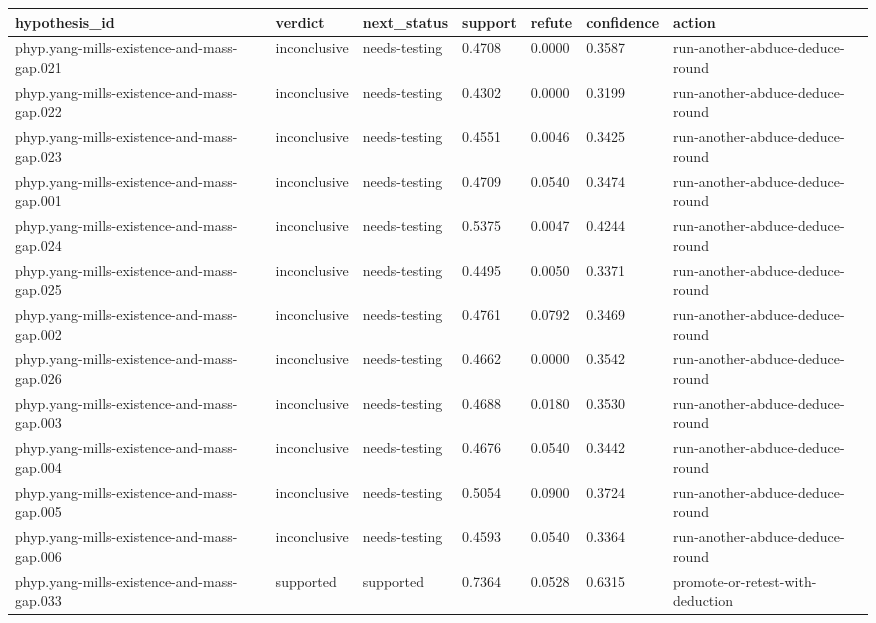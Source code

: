 \documentclass[
]{article}
\newcounter{none} %
\begin{document}
{\def\LTcaptype{none} %
\begin{longtable}[]{@{}lllllll@{}}
\toprule\noalign{}
hypothesis\_id & verdict & next\_status & support & refute & confidence
& action \\
\midrule\noalign{}
\endhead
\bottomrule\noalign{}
\endlastfoot
phyp.yang-mills-existence-and-mass-gap.021 & inconclusive &
needs-testing & 0.4708 & 0.0000 & 0.3587 &
run-another-abduce-deduce-round \\
phyp.yang-mills-existence-and-mass-gap.022 & inconclusive &
needs-testing & 0.4302 & 0.0000 & 0.3199 &
run-another-abduce-deduce-round \\
phyp.yang-mills-existence-and-mass-gap.023 & inconclusive &
needs-testing & 0.4551 & 0.0046 & 0.3425 &
run-another-abduce-deduce-round \\
phyp.yang-mills-existence-and-mass-gap.001 & inconclusive &
needs-testing & 0.4709 & 0.0540 & 0.3474 &
run-another-abduce-deduce-round \\
phyp.yang-mills-existence-and-mass-gap.024 & inconclusive &
needs-testing & 0.5375 & 0.0047 & 0.4244 &
run-another-abduce-deduce-round \\
phyp.yang-mills-existence-and-mass-gap.025 & inconclusive &
needs-testing & 0.4495 & 0.0050 & 0.3371 &
run-another-abduce-deduce-round \\
phyp.yang-mills-existence-and-mass-gap.002 & inconclusive &
needs-testing & 0.4761 & 0.0792 & 0.3469 &
run-another-abduce-deduce-round \\
phyp.yang-mills-existence-and-mass-gap.026 & inconclusive &
needs-testing & 0.4662 & 0.0000 & 0.3542 &
run-another-abduce-deduce-round \\
phyp.yang-mills-existence-and-mass-gap.003 & inconclusive &
needs-testing & 0.4688 & 0.0180 & 0.3530 &
run-another-abduce-deduce-round \\
phyp.yang-mills-existence-and-mass-gap.004 & inconclusive &
needs-testing & 0.4676 & 0.0540 & 0.3442 &
run-another-abduce-deduce-round \\
phyp.yang-mills-existence-and-mass-gap.005 & inconclusive &
needs-testing & 0.5054 & 0.0900 & 0.3724 &
run-another-abduce-deduce-round \\
phyp.yang-mills-existence-and-mass-gap.006 & inconclusive &
needs-testing & 0.4593 & 0.0540 & 0.3364 &
run-another-abduce-deduce-round \\
phyp.yang-mills-existence-and-mass-gap.033 & supported & supported &
0.7364 & 0.0528 & 0.6315 & promote-or-retest-with-deduction \\

\end{longtable}}
\end{document}
